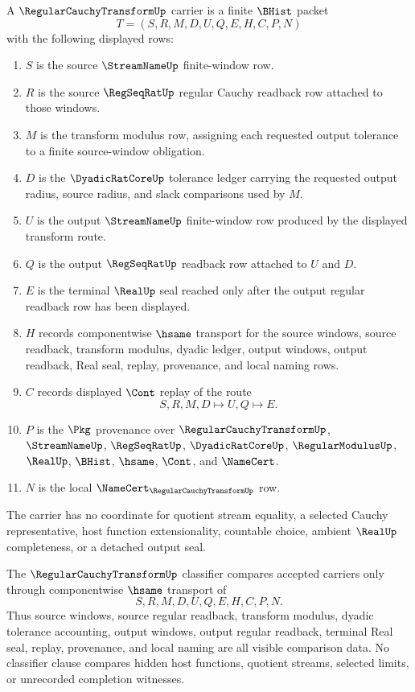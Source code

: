 \begin{definition}
\label{def:regular-cauchy-transform-carrier}
A $\RegularCauchyTransformUp$ carrier is a finite $\BHist$ packet
$$
T=(S,R,M,D,U,Q,E,H,C,P,N)
$$
with the following displayed rows:
\begin{enumerate}
\item $S$ is the source $\StreamNameUp$ finite-window row.
\item $R$ is the source $\RegSeqRatUp$ regular Cauchy readback row attached to those windows.
\item $M$ is the transform modulus row, assigning each requested output tolerance to a finite source-window obligation.
\item $D$ is the $\DyadicRatCoreUp$ tolerance ledger carrying the requested output radius, source radius, and slack comparisons used by $M$.
\item $U$ is the output $\StreamNameUp$ finite-window row produced by the displayed transform route.
\item $Q$ is the output $\RegSeqRatUp$ readback row attached to $U$ and $D$.
\item $E$ is the terminal $\RealUp$ seal reached only after the output regular readback row has been displayed.
\item $H$ records componentwise $\hsame$ transport for the source windows, source readback, transform modulus, dyadic ledger, output windows, output readback, Real seal, replay, provenance, and local naming rows.
\item $C$ records displayed $\Cont$ replay of the route
$$
S,R,M,D \longmapsto U,Q \longmapsto E .
$$
\item $P$ is the $\Pkg$ provenance over $\RegularCauchyTransformUp$, $\StreamNameUp$, $\RegSeqRatUp$, $\DyadicRatCoreUp$, $\RegularModulusUp$, $\RealUp$, $\BHist$, $\hsame$, $\Cont$, and $\NameCert$.
\item $N$ is the local $\NameCert_{\RegularCauchyTransformUp}$ row.
\end{enumerate}
The carrier has no coordinate for quotient stream equality, a selected Cauchy representative, host function extensionality, countable choice, ambient $\RealUp$ completeness, or a detached output seal.
\end{definition}

\begin{definition}
\label{def:regular-cauchy-transform-classifier}
The $\RegularCauchyTransformUp$ classifier compares accepted carriers only through componentwise $\hsame$ transport of
$$
S,R,M,D,U,Q,E,H,C,P,N.
$$
Thus source windows, source regular readback, transform modulus, dyadic tolerance accounting, output windows, output regular readback, terminal Real seal, replay, provenance, and local naming are all visible comparison data. No classifier clause compares hidden host functions, quotient streams, selected limits, or unrecorded completion witnesses.
\end{definition}

